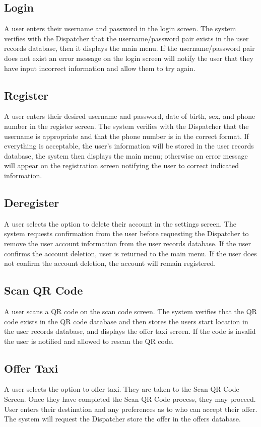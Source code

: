 \documentclass[english]{article}
\begin{document}
\subsection{Login}
A user enters their username and password in the login screen. The system verifies with the Dispatcher that the username/password pair exists in the user records database, then it displays the main menu. If the username/password pair does not exist an error message on the login screen will notify the user that they have input incorrect information and allow them to try again. 
\subsection{Register}
A user enters their desired username and password, date of birth, sex, and phone number in the register screen. The system verifies with the Dispatcher that the username is appropriate and that the phone number is in the correct format. If everything is acceptable, the user's information will be stored in the user records database, the system then displays the main menu; otherwise an error message will appear on the registration screen notifying the user to correct indicated information. 
\subsection{Deregister}
A user selects the option to delete their account in the settings screen. The system requests confirmation from the user before requesting the Dispatcher to remove the user account information from the user records database. If the user confirms the account deletion, user is returned to the main menu. If the user does not confirm the account deletion, the account will remain registered. 
\subsection{Scan QR Code}
A user scans a QR code on the scan code screen. The system verifies that the QR code exists in the QR code database and then stores the users start location in the user records database, and displays the offer taxi screen. If the code is invalid the user is notified and allowed to rescan the QR code. 
\subsection{Offer Taxi}
A user selects the option to offer taxi. They are taken to the Scan QR Code Screen. Once they have completed the Scan QR Code process, they may proceed. User enters their destination and any preferences as to who can accept their offer. The system will request the Dispatcher store the offer in the offers database. 
\end{document}
